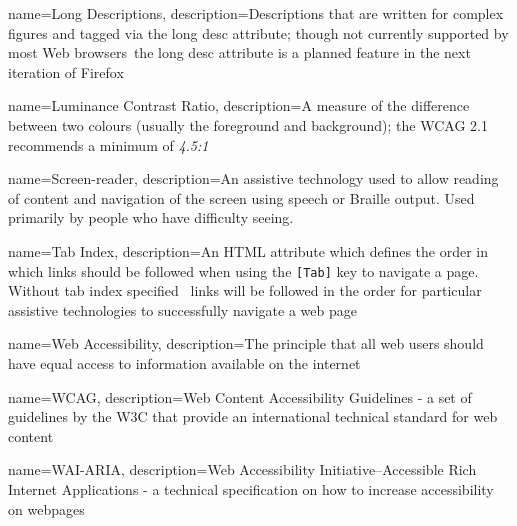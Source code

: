 {
    name=Long Descriptions,
    description=Descriptions that are written for complex figures and tagged via the long desc attribute; though not currently supported by most Web browsers\, the long desc attribute is a planned feature in the next iteration of Firefox
}

{
    name=Luminance Contrast Ratio,
    description=A measure of the difference between two colours (usually the foreground and background); the WCAG 2.1 recommends a minimum of \textit{4.5:1}
}

{
    name=Screen-reader,
    description=An assistive technology used to allow reading of content and navigation of the screen using speech or Braille output. Used primarily by people who have difficulty seeing.
}

{
    name=Tab Index,
    description=An HTML attribute which defines the order in which links should be followed when using the \texttt{[Tab]} key to navigate a page. Without tab index specified \, links will be followed in the order for particular assistive technologies to successfully navigate a web page
}

{
    name=Web Accessibility,
    description=The principle that all web users should have equal access to information available on the internet
}

{
    name=WCAG,
    description=Web Content Accessibility Guidelines - a set of guidelines by the W3C that provide an international technical standard for web content
}

{
    name=WAI-ARIA,
    description=Web Accessibility Initiative–Accessible Rich Internet Applications - a technical specification on how to increase accessibility on webpages
}